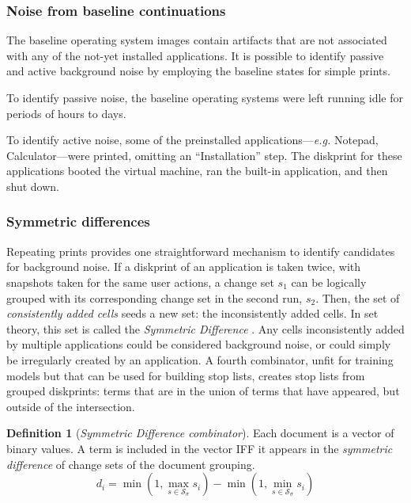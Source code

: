 \documentclass[11pt]{ucthesis}
\theoremstyle{plain}
\theoremstyle{definition}
\newtheorem{defn}[thm]{Definition} %
\newcommand{\eg}{\emph{e.g.}\xspace}
\begin{document}
\subsubsection{Noise from baseline continuations}

The baseline operating system images contain artifacts that are not associated with any of the not-yet installed applications.  It is possible to identify passive and active background noise by employing the baseline states for simple prints.

To identify passive noise, the baseline operating systems were left running idle for periods of hours to days.

To identify active noise, some of the preinstalled applications---\eg Notepad, Calculator---were printed, omitting an ``Installation'' step.  The diskprint for these applications booted the virtual machine, ran the built-in application, and then shut down.


\subsubsection{Symmetric differences}
\label{sec:symdiff}

Repeating prints provides one straightforward mechanism to identify candidates for background noise.  If a diskprint of an application is taken twice, with snapshots taken for the same user actions, a change set $s_1$ can be logically grouped with its corresponding change set in the second run, $s_2$.  Then, the set of \emph{consistently added cells} seeds a new set: the inconsistently added cells.  In set theory, this set is called the \emph{Symmetric Difference} \cite{mathworld:symmetricdifference}.  Any cells inconsistently added by multiple applications could be considered background noise, or could simply be irregularly created by an application.  A fourth combinator, unfit for training models but that can be used for building stop lists, creates stop lists from grouped diskprints: terms that are in the union of terms that have appeared, but outside of the intersection.

\begin{defn}[\textit{Symmetric Difference combinator}]
Each document is a vector of binary values.  A term is included in the vector IFF it appears in the \emph{symmetric difference} \cite{mathworld:symmetricdifference} of change sets of the document grouping.
$$d_i = \min( 1, \max_{s \in \mathcal{S}_\sigma} s_i ) - \min( 1, \min_{s \in \mathcal{S}_\sigma} s_i )$$
\end{defn}
\end{document}
